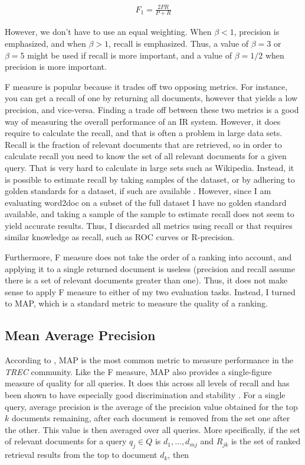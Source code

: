 \begin{gather}
  F_1= \frac{2PR}{P + R}
\end{gather}

However, we don't have to use an equal weighting. When $\beta < 1$, precision is emphasized, and when $\beta > 1$, recall is
emphasized. Thus, a value of $\beta = 3$ or $\beta = 5$ might be used if recall is more important, and a value of $\beta = 1/2$
when precision is more important.

F measure is popular because it trades off two opposing metrics. For instance, you can get a recall of one by returning all
documents, however that yields a low precision, and vice-versa. Finding a trade off between these two metrics is a good way of
measuring the overall performance of an IR system. However, it does require to calculate the recall, and that is often a problem in
large data sets. Recall is the fraction of relevant documents that are retrieved, so in order to calculate recall you need to know the
set of all relevant documents for a given query. That is very hard to calculate in large sets such as Wikipedia. Instead,
it is possible to estimate recall by taking samples of the dataset, or by adhering to golden standards for a dataset, if such are
available \citep{manning2009}. However, since I am evaluating word2doc on a subset of the full dataset I have no golden standard
available, and taking a sample of the sample to estimate recall does not seem to yield accurate results. Thus, I discarded all
metrics using recall or that requires similar knowledge as recall, such as ROC curves or R-precision.

Furthermore, F measure does not take the order of a ranking into account, and applying it to a single returned document is
useless (precision and recall assume there is a set of relevant documents greater than one). Thus, it does not make sense to
apply F measure to either of my two evaluation tasks. Instead, I turned to MAP, which is a standard metric to measure the
quality of a ranking.


\subsection{Mean Average Precision}
\label{exp:map}

According to \citet{manning2009}, MAP is the most common metric to measure performance in the \textit{TREC} community. Like the
F measure, MAP also provides a single-figure measure of quality for all queries. It does this across all levels of recall and has
been shown to have especially good discrimination and stability \citep{manning2009}. For a single query, average precision is the
average of the precision value obtained for the top $k$ documents remaining, after each document is removed from the set one after
the other. This value is then averaged over all queries. More specifically, if the set of relevant documents for a query $q_j \in
Q$ is ${d_1,...,d_{mj}}$ and $R_{jk}$ is the set of ranked retrieval results from the top to document $d_k$, then

